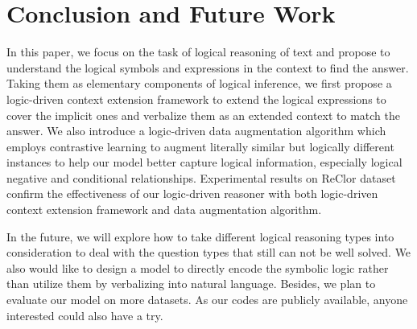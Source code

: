 \documentclass[11pt,a4paper]{article}
\begin{document}
\section{Conclusion and Future Work}
In this paper, we focus on the task of logical reasoning of text and propose to understand the logical symbols and expressions in the context to find the answer. Taking them as elementary components of logical inference, we first propose a logic-driven context extension framework to extend the logical expressions to cover the implicit ones and verbalize them as an extended context to match the answer. We also introduce a logic-driven data augmentation algorithm which employs contrastive learning to augment literally similar but logically different instances to help our model better capture logical information, especially logical negative and conditional relationships. Experimental results on ReClor dataset confirm the effectiveness of our logic-driven reasoner with both logic-driven context extension framework and data augmentation algorithm.

In the future, we will explore how to take different logical reasoning types into consideration to deal with the question types that still can not be well solved. We also would like to design a model to directly encode the symbolic logic rather than utilize them by verbalizing into natural language. Besides, we plan to evaluate our model on more datasets. As our codes are publicly available, anyone interested 
could also have a try.




\end{document}
